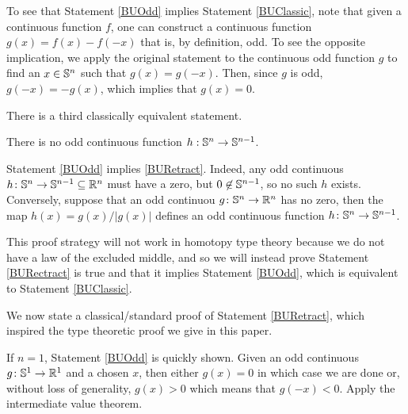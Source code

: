 \documentclass{amsart}
\begin{document}
To see that Statement \ref{BUOdd} implies Statement \ref{BUClassic}, note
that given a continuous function $f$, one can construct a continuous
function $g(x) = f(x) - f(-x)$ that is, by definition, odd. To see the
opposite implication, we apply the original statement to the
continuous odd function $g$ to find an $x \in \mathbb{S}^n$ such that
$g(x)=g(-x)$. Then, since $g$ is odd, $g(-x) = -g(x)$, which implies
that $g(x)=0$.

There is a third classically equivalent statement.

\begin{statement}\label{BURetract}
  There is no odd continuous function $h:\mathbb{S}^n \rightarrow \mathbb{S}^{n-1}$.
\end{statement}

Statement \ref{BUOdd} implies \ref{BURetract}. Indeed, any odd
continuous $h \colon \mathbb{S}^n \to \mathbb{S}^{n-1} \subseteq \mathbb{R}^n$ must have a
zero, but $0 \not\in \mathbb{S}^{n-1}$, so no such $h$ exists.  Conversely,
suppose that an odd continuou $g \colon \mathbb{S}^n \to \mathbb{R}^n$ has no zero,
then the map $h(x) = g(x) / \vert g(x) \vert$ defines an odd
continuous function $h \colon \mathbb{S}^n \to \mathbb{S}^{n-1}$. 

This proof strategy will not work in homotopy type theory because we
do not have a law of the excluded middle, and so we will instead prove
Statement \ref{BURectract} is true and that it implies Statement
\ref{BUOdd}, which is equivalent to Statement \ref{BUClassic}.

We now state a classical/standard proof of Statement \ref{BURetract},
which inspired the type theoretic proof we give in this paper.



If $n=1$, Statement \ref{BUOdd} is quickly shown. Given an odd
continuous $g \colon \mathbb{S}^1 \to \mathbb{R}^1$ and a chosen $x$, then either
$g(x)=0$ in which case we are done or, without loss of generality,
$g(x) > 0$ which means that $g(-x) < 0$.  Apply the intermediate value
theorem.

\end{document}
